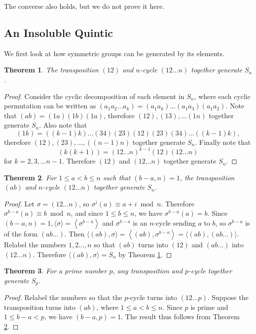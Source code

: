 \documentclass[12pt]{article}
\newtheorem{theorem}{Theorem}
\begin{document}
The converse also holds, but we do not prove it here.

\subsection{An Insoluble Quintic}
We first look at how symmetric groups can be generated by its elements. 

\begin{theorem} \label{thm:symmetric-12-12n}
    The transposition $(12)$ and $n$-cycle $(12 \dots n)$ together generate $S_n$. 
\end{theorem}
\begin{proof}
    Consider the cyclic decomposition of each element in $S_n$, where each cyclic permutation can be written as 
    $
    (a_1a_2\dots a_k) = (a_1 a_k) \dots (a_1 a_3) (a_1 a_2). 
    $
    Note that $(ab) = (1a)(1b)(1a)$, therefore $(12), (13), \ldots (1n)$ together generate $S_n$. Also note that  
    $$(1k)=((k-1)k)\dots(34)(23)(12)(23)(34)\dots((k-1)k),$$
    therefore $(12), (23), \dots, ((n-1)n)$ together generate $S_n$. Finally note that 
    $$
    (k(k+1)) = (12\dots n)^{k-1} (12) (12\dots n)
    $$
    for $k = 2, 3, \dots n - 1$. Therefore $(12)$ and $(12 \dots n)$ together generate $S_n$. 
\end{proof}

\begin{theorem} \label{thm:symmetric-ab-12n}
    For $1 \le a < b \le n$ such that $(b - a, n) = 1$, the transposition $(ab)$ and $n$-cycle $(12 \dots n)$ together generate $S_n$.
\end{theorem}
\begin{proof}
   Let $\sigma=(12 \ldots n)$, so $\sigma^i(a) \equiv a+i \bmod n$. Therefore $\sigma^{b-a}(a) \equiv b \bmod n$, and since $1 \le b \le n$, we have $\sigma^{b-a}(a)=b$. Since $(b-a, n)=1,\langle\sigma\rangle=\left\langle\sigma^{b-a}\right\rangle$ and $\sigma^{b-a}$ is an $n$-cycle sending $a$ to $b$, so $\sigma^{b-a}$ is of the form $(a b \ldots)$. Then
$
\langle(a b), \sigma\rangle=\left\langle(a b), \sigma^{b-a}\right\rangle=\langle(a b),(a b \ldots)\rangle .
$
Relabel the numbers $1,2 \ldots, n$ so that $(a b)$ turns into $(12)$ and $(a b \ldots)$ into $(12 \ldots n)$. Therefore $\langle(a b), \sigma\rangle=S_n$ by Theorem \ref{thm:symmetric-12-12n}.
\end{proof}

\begin{theorem} \label{thm:symmetric-prime}
    For a prime number $p$, any transposition and $p$-cycle together generate $S_p$.
\end{theorem}
\begin{proof}
    Relabel the numbers so that the $p$-cycle turns into $(12 \dots p)$. Suppose the transposition turns into $(ab)$, where $1 \le a < b \le n$. Since $p$ is prime and $1 \le b - a < p$, we have $(b - a, p) = 1$. The result thus follows from Theorem \ref{thm:symmetric-ab-12n}.
\end{proof}
\end{document}
